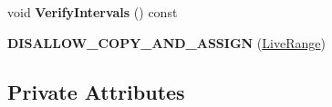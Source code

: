 \begin{DoxyCompactItemize}
\item 
void {\bfseries Verify\+Intervals} () const \hypertarget{classv8_1_1internal_1_1compiler_1_1_live_range_a89497c12df09447895536d1ad13b7a60}{}\label{classv8_1_1internal_1_1compiler_1_1_live_range_a89497c12df09447895536d1ad13b7a60}

\item 
{\bfseries D\+I\+S\+A\+L\+L\+O\+W\+\_\+\+C\+O\+P\+Y\+\_\+\+A\+N\+D\+\_\+\+A\+S\+S\+I\+GN} (\hyperlink{classv8_1_1internal_1_1compiler_1_1_live_range}{Live\+Range})\hypertarget{classv8_1_1internal_1_1compiler_1_1_live_range_acb2c56c4589389e33a60384b2c42c59b}{}\label{classv8_1_1internal_1_1compiler_1_1_live_range_acb2c56c4589389e33a60384b2c42c59b}

\end{DoxyCompactItemize}
\subsection*{Private Attributes}
